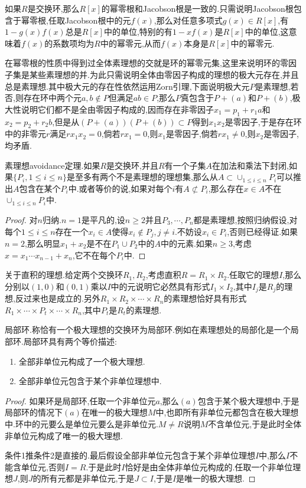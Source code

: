 如果$R$是交换环,那么$R[x]$的幂零根和Jacobson根是一致的.只需说明Jacobson根包含于幂零根,任取Jacobson根中的元$f(x)$,那么对任意多项式$g(x)\in R[x]$,有$1-g(x)f(x)$总是$R[x]$中的单位,特别的有$1-xf(x)$是$R[x]$中的单位,这意味着$f(x)$的系数项均为$R$中的幂零元,从而$f(x)$本身是$R[x]$中的幂零元.

在幂零根的性质中得到过全体素理想的交就是环的幂零元集,这里来说明环的零因子集是某些素理想的并.为此只需说明全体由零因子构成的理想的极大元存在,并且总是素理想.其中极大元的存在性依然运用Zorn引理,下面说明极大元$P$是素理想,若否,则存在环中两个元$a,b\not\in P$但满足$ab\in P$,那么$P$真包含于$P+(a)$和$P+(b)$,极大性说明它们都不是全由零因子构成的,因而存在非零因子$x_1=p_1+r_1a$和$x_2=p_2+r_2b$,但是从$(P+(a))(P+(b))\subset P$得到$x_1x_2$是零因子,于是存在环中的非零元$r$满足$rx_1x_2=0$,倘若$rx_1=0$,则$x_1$是零因子,倘若$rx_1\not=0$,则$x_2$是零因子,均矛盾.

素理想avoidance定理.如果$R$是交换环,并且$R$有一个子集$A$在加法和乘法下封闭,如果$\{P_i,1\le i\le n\}$是至多有两个不是素理想的理想集,那么从$A\subset\cup_{1\le i\le n}P_i$可以推出$A$包含在某个$P_i$中.或者等价的说,如果对每个$i$有$A\not\subset P_i$,那么存在$x\in A$不在$\cup_{1\le i\le n}P_i$中.
\begin{proof}
	
	对$n$归纳.$n=1$是平凡的,设$n\ge2$并且$P_3,\cdots,P_n$都是素理想,按照归纳假设,对每个$1\le i\le n$存在一个$x_i\in A$使得$x_i\not\in P_j,j\not=i$.不妨设$x_i\in P_i$,否则已经得证.如果$n=2$,那么明显$x_1+x_2$是不在$P_1\cup P_2$中的$A$中的元素.如果$n\ge3$,考虑$x=x_1\cdots x_{n-1}+x_n$,它不在每个$P_i$中.
\end{proof}

关于直积的理想.给定两个交换环$R_1,R_2$,考虑直积$R=R_1\times R_2$.任取它的理想$I$,那么分别以$(1,0)$和$(0,1)$乘以$I$中的元说明它必然具有形式$I_1\times I_2$,其中$I_j$是$R_j$的理想,反过来也是成立的.另外$R_1\times R_2\times\cdots\times R_n$的素理想恰好具有形式$R_1\times\cdots\times P_t\times\cdots\times R_n$,其中$P_t$是$R_t$的素理想.

局部环.称恰有一个极大理想的交换环为局部环.例如在素理想处的局部化是一个局部环.局部环具有两个等价描述:
\begin{enumerate}
	\item 全部非单位元构成了一个极大理想.
	\item 全部非单位元包含于某个非单位理想中.
\end{enumerate}
\begin{proof}
	
	如果环是局部环,任取一个非单位元$a$,那么$(a)$包含于某个极大理想中,于是局部环的情况下$(a)$在唯一的极大理想$M$中,也即所有非单位元都包含在极大理想中.环中的元要么是单位元要么是非单位元.$M\not=R$说明$M$不含单位元,于是此时全体非单位元构成了唯一的极大理想.
	
	条件1推条件2是直接的.最后假设全部非单位元包含于某个非单位理想$I$中,那么$I$不能含单位元,否则$I=R$.于是此时$I$恰好是由全体非单位元构成的.任取一个非单位理想$J$,则$J$的所有元都是非单位元,于是$J\subset I$,于是$I$是唯一的极大理想.
\end{proof}

